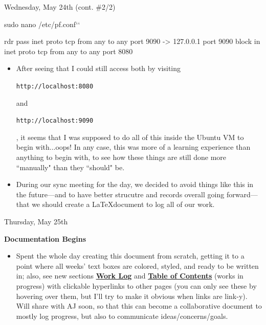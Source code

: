 \documentclass[11pt]{article}
\newcommand\codebox[1]{
    \noindent\hspace{-0.25em}\begin{tcolorbox}[on line, hbox, colback = codeblack, colframe = codeborder, coltext = white, boxrule = 1.5pt, left = 2pt, right = 2pt, top = 0.5pt, bottom = 0.5pt]
    \small\texttt{#1}\normalsize
    \end{tcolorbox}\hspace{-0.25em}
}
\newcommand{\StartConsole}{\gdef\MyMacTerminalPrompt{}}
\begin{document}
\begin{redbox}{Wednesday, May 24th (cont. \#2/2)\vspace{-2.2em}\begin{flushright}\large{}\end{flushright}}
    \begin{MacTerminal}
 sudo nano /etc/pf.conf`\StartConsole`

rdr pass inet proto tcp from any to any port 9090 -> 127.0.0.1 port 9090
block in inet proto tcp from any to any port 8080
    \end{MacTerminal}
\begin{itemize}
    \begin{itemize}
        \item After saving changes and exiting, I enabled \codebox{pf} by running \codebox{sudo pfctl -e}.
    \end{itemize}
    \item After seeing that I could still access both by visiting \codebox{http://localhost:8080} and \codebox{http://localhost:9090}, it seems that I was supposed to do all of this inside the Ubuntu VM to begin with...oops! In any case, this was more of a learning experience than anything to begin with, to see how these things are still done more ``manually" than they ``should" be. 
    \item During our sync meeting for the day, we decided to avoid things like this in the future---and to have better strucutre and records overall going forward---that we should create a \LaTeX document to log all of our work.
\end{itemize}
\end{redbox}

\begin{center}
\hspace{0.2cm}
\vspace{-0.5em}
\end{center}

\begin{redbox}{Thursday, May 25th\vspace{-2.2em}\begin{flushright}\large\textbf{Documentation Begins} \end{flushright}}
\begin{itemize}
    \item Spent the whole day creating this document from scratch, getting it to a point where all weeks' text boxes are colored, styled, and ready to be written in; also, see new sections \hyperlink{page.1}{\textbf{Work Log}} and \hyperlink{page.1}{\textbf{Table of Contents}} (works in progress) with clickable hyperlinks to other pages (you can only see these by hovering over them, but I'll try to make it obvious when links are link-y). Will share with AJ soon, so that this can become a collaborative document to mostly log progress, but also to communicate ideas/concerns/goals.
\end{itemize}
\end{redbox}
\end{document}
